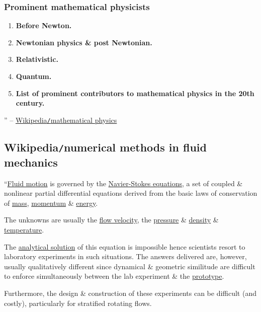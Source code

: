 \documentclass{article}
\begin{document}
\subsubsection{Prominent mathematical physicists}

\begin{enumerate}
	\item {\bf Before Newton.}
	\item {\bf Newtonian physics \& post Newtonian.}
	\item {\bf Relativistic.}
	\item {\bf Quantum.}
	\item {\bf List of prominent contributors to mathematical physics in the 20th century.}
\end{enumerate}
'' -- \href{https://en.wikipedia.org/wiki/Mathematical_physics}{Wikipedia{\tt/}mathematical physics}


\subsection{Wikipedia{\tt/}numerical methods in fluid mechanics}
``\href{https://en.wikipedia.org/wiki/Fluid_motion}{Fluid motion} is governed by the \href{https://en.wikipedia.org/wiki/Navier-Stokes_equations}{Navier-Stokes equations}, a set of coupled \& nonlinear partial differential equations derived from the basic laws of conservation of \href{https://en.wikipedia.org/wiki/Mass}{mass}, \href{https://en.wikipedia.org/wiki/Momentum}{momentum} \& \href{https://en.wikipedia.org/wiki/Energy}{energy}.

The unknowns are usually the \href{https://en.wikipedia.org/wiki/Flow_velocity}{flow velocity}, the \href{https://en.wikipedia.org/wiki/Pressure}{pressure} \& \href{https://en.wikipedia.org/wiki/Density}{density} \& \href{https://en.wikipedia.org/wiki/Temperature}{temperature}.

The \href{https://en.wikipedia.org/wiki/Analytical_solution}{analytical solution} of this equation is impossible hence scientists resort to laboratory experiments in such situations. The answers delivered are, however, usually qualitatively different since dynamical \& geometric similitude are difficult to enforce simultaneously between the lab experiment \& the \href{https://en.wikipedia.org/wiki/Prototype}{prototype}.

Furthermore, the design \& construction of these experiments can be difficult (and costly), particularly for stratified rotating flows.
\end{document}
